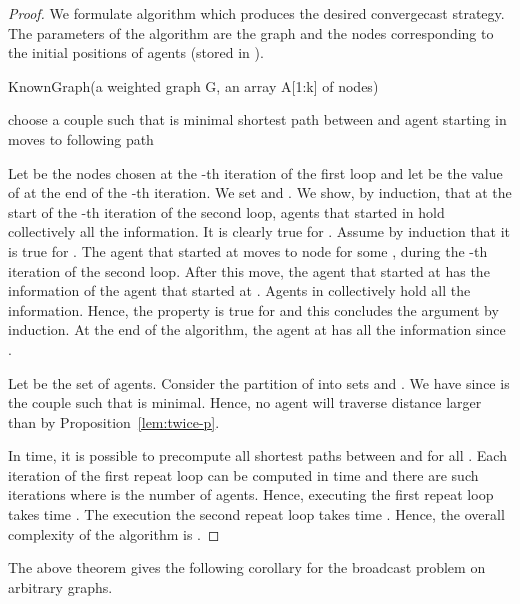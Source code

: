 \documentclass{article}
\begin{document}
\begin{proof}
We formulate algorithm  which produces the desired convergecast strategy.
The parameters of the algorithm are the graph  and the nodes corresponding to the initial positions of agents (stored in ). 

\medskip

\begin{algorithm}[H]
\caption{KnownGraph(a weighted graph G, an array A{[1:k]} of nodes) \label{algo:graph}}
  
\;
\;
\;
\Repeat{}
{
	choose a couple  such that  is minimal\;
	\;
	 shortest path between  and \;
	\;
	\;
}
\Repeat{}
{
	\;
	agent starting in  moves to  following path \;
}
\end{algorithm}


\medskip
Let  be the nodes chosen at the -th iteration of the first loop and let  be the value of  at the end of the -th iteration. We set  and . We show, by induction, that at the start of the -th iteration of the second loop, agents that started in  hold collectively all the information. It is clearly true for . Assume by induction that it is true for . The agent that started at  moves to node  for some , during the -th iteration of the second loop. After this move, the agent that started at  has the information of the agent that started at . Agents in  collectively hold all the information. Hence, the property is true for  and this concludes the argument by induction. At the end of the algorithm, the agent at  has all the information since .

Let  be the set of agents. Consider the partition of  into sets  and . We have  since  is the couple 
 such that  is minimal. Hence, no agent will traverse distance larger than  by Proposition~\ref{lem:twice-p}.

In  time, it is possible to precompute all shortest paths between  and  for all . Each iteration of the first repeat loop can be computed in  time and there are  such iterations where  is the number of agents. Hence, executing the first repeat loop takes time . The execution the second repeat loop takes time . Hence, the overall complexity of the algorithm is .
\end{proof}

\medskip

The above theorem gives the following corollary for the broadcast problem on arbitrary graphs.
\end{document}
